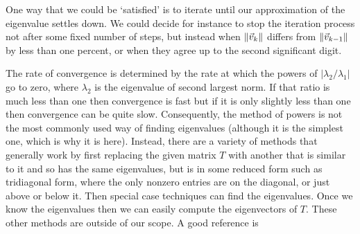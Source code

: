 One way that we could be `satisfied'
is to iterate until our approximation of the eigenvalue settles down.
We could decide for instance to stop the iteration
process not after some fixed number of steps, but instead
when $\lVert\vec{v}_k\rVert$ differs from $\lVert\vec{v}_{k-1}\rVert$ 
by less than one percent, or when they agree up to the 
second significant digit. 

The rate of convergence is determined by the rate at which 
the powers of $|\lambda_2/\lambda_1|$ go to zero,
where $\lambda_2$ is the eigenvalue of second largest norm. 
If that ratio is much less than one then convergence is fast but
if it is only slightly less than one then convergence can be quite slow.
Consequently, the method of powers
is not the most commonly used way of finding eigenvalues
(although it is the simplest one, which is why it is here).
Instead, there are a variety of methods that generally work by first 
replacing the given matrix $T$ with another that is similar to it
and so has the same eigenvalues, but is in some reduced form
such as 
tridiagonal form,
where the only nonzero
entries are on the diagonal, or just above or below it.
Then special case techniques can find the eigenvalues.
Once we know the eigenvalues then we can easily compute 
the eigenvectors of $T$. 
These other methods are outside of our scope.
A good reference is \cite{Goult}



